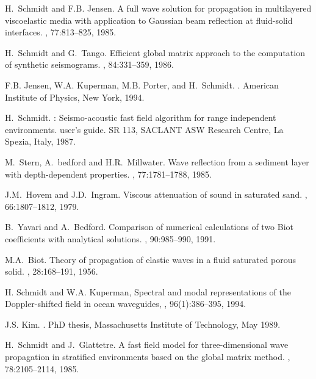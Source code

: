 \begin{thebibliography}{1}

H.~Schmidt and F.B. Jensen.
\newblock A full wave solution for propagation in multilayered viscoelastic
  media with application to {G}aussian beam reflection at fluid-solid
  interfaces.
, 77:813--825, 1985.

H.~Schmidt and G.~Tango.
\newblock Efficient global matrix approach to the computation of synthetic
  seismograms.
, 84:331--359, 1986.

F.B. Jensen, W.A. Kuperman, M.B. Porter, and H.~Schmidt.
.
\newblock American Institute of Physics, New York, 1994.

H.~Schmidt.
: Seismo-acoustic fast field algorithm for range
  independent environments. user's guide.
\newblock SR 113, SACLANT ASW Research Centre, La Spezia, Italy, 1987.

M.~Stern, A.~bedford and H.R.~Millwater.
\newblock Wave reflection from a sediment layer with depth-dependent properties.
, 77:1781--1788, 1985.

J.M.~Hovem and J.D.~Ingram.
\newblock Viscous attenuation of sound in saturated sand.
, 66:1807--1812, 1979.

B.~Yavari and A.~Bedford.
\newblock Comparison of numerical calculations of two Biot
coefficients with analytical solutions.
, 90:985--990, 1991.

M.A.~Biot.
\newblock Theory of propagation of elastic waves in a fluid saturated
porous solid.
, 28:168--191, 1956.

H. Schmidt and W.A. Kuperman, Spectral and modal representations of
the Doppler-shifted field in ocean waveguides, 
, 96(1):386--395, 1994.

J.S. Kim.
.
\newblock PhD thesis, Massachusetts Institute of Technology, May 1989.

H.~Schmidt and J.~Glattetre.
\newblock A fast field model for three-dimensional wave propagation in
  stratified environments based on the global matrix method.
, 78:2105--2114, 1985.


\end{thebibliography}
